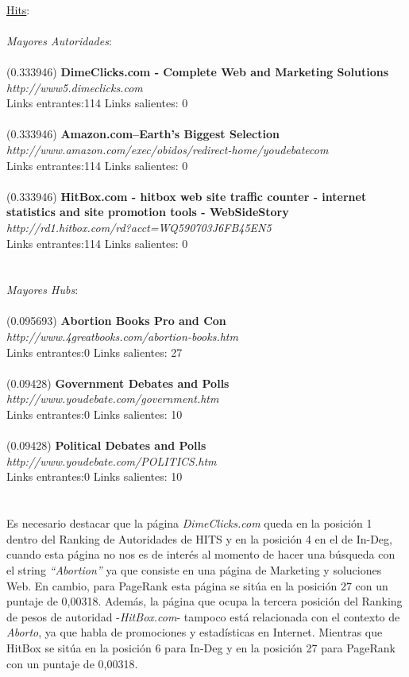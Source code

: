 \documentclass[a4paper]{article}
\begin{document}
\\
\underline{Hits}: \\
\\
\emph{Mayores Autoridades}: \\
\\
(0.333946) \textbf{DimeClicks.com - Complete Web and Marketing Solutions} \\
\textit{http://www5.dimeclicks.com }\\
Links entrantes:114 \indent Links salientes: 0\\
\\
(0.333946) \textbf{Amazon.com--Earth's Biggest Selection} \\
\textit{http://www.amazon.com/exec/obidos/redirect-home/youdebatecom} \\
Links entrantes:114 \indent Links salientes: 0\\
\\
(0.333946) \textbf{HitBox.com - hitbox web site traffic counter - internet statistics and site promotion tools - WebSideStory} \\
\textit{http://rd1.hitbox.com/rd?acct=WQ590703J6FB45EN5} \\
Links entrantes:114 \indent Links salientes: 0\\
\\
\\
\emph{Mayores Hubs}: \\
\\
(0.095693)\textbf{ Abortion Books Pro and Con} \\
\textit{http://www.4greatbooks.com/abortion-books.htm} \\
Links entrantes:0 \indent Links salientes: 27\\
\\
(0.09428) \textbf{Government Debates and Polls} \\
\textit{http://www.youdebate.com/government.htm }\\
Links entrantes:0 \indent Links salientes: 10\\
\\
(0.09428) \textbf{Political Debates and Polls }\\
\textit{http://www.youdebate.com/POLITICS.htm} \\
Links entrantes:0 \indent Links salientes: 10\\
\\
\\
\indent Es necesario destacar que  la p\'agina \emph{DimeClicks.com} queda en la posici\'on 1 dentro del Ranking de Autoridades de HITS y en la posici\'on 4 en el de In-Deg, cuando esta p\'agina no nos es de inter\'es al momento de hacer una b\'usqueda con el string \textit{``Abortion''} ya que consiste en una p\'agina de Marketing y soluciones Web. En cambio, para PageRank esta p\'agina se sit\'ua en la posici\'on 27 con un puntaje de 0,00318. Adem\'as, la p\'agina que ocupa la tercera posici\'on del Ranking de pesos de autoridad -\emph{HitBox.com}- tampoco est\'a relacionada con el contexto de \emph{Aborto}, ya que habla de promociones y estad\'isticas en Internet. Mientras que HitBox se sit\'ua en la posici\'on 6 para In-Deg y en la posici\'on 27 para PageRank con un puntaje de 0,00318. \\
\end{document}
